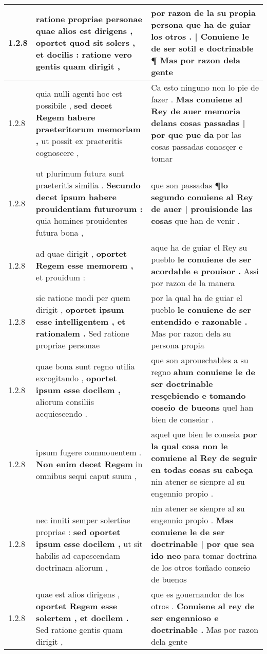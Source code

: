 \begin{tabular}{|p{1cm}|p{6.5cm}|p{6.5cm}|}
1.2.8 & ratione propriae personae \textbf{ quae alios est dirigens , oportet quod sit solers , et docilis : } ratione vero gentis quam dirigit , & por razon de la su propia persona \textbf{ que ha de guiar los otros . | Conuiene le de ser sotil e doctrinable ¶ } Mas por razon dela gente \\\hline
1.2.8 & quia nulli agenti hoc est possibile , \textbf{ sed decet Regem habere praeteritorum memoriam , } ut possit ex praeteritis cognoscere , & Ca esto ninguno non lo pie de fazer . \textbf{ Mas conuiene al Rey de auer memoria delans cosas passadas | por que pue da } por las cosas passadas conosçer e tomar \\\hline
1.2.8 & ut plurimum futura sunt praeteritis similia . \textbf{ Secundo decet ipsum habere prouidentiam futurorum : } quia homines prouidentes futura bona , & que son passadas \textbf{ ¶lo segundo conuiene al Rey de auer | prouisionde las cosas } que han de venir . \\\hline
1.2.8 & ad quae dirigit , \textbf{ oportet Regem esse memorem , } et prouidum : & aque ha de guiar el Rey su pueblo \textbf{ le conuiene de ser acordable e prouisor . } Assi por razon de la manera \\\hline
1.2.8 & sic ratione modi per quem dirigit , \textbf{ oportet ipsum esse intelligentem , et rationalem . } Sed ratione propriae personae & por la qual ha de guiar el pueblo \textbf{ le conuiene de ser entendido e razonable . } Mas por razon dela su persona propia \\\hline
1.2.8 & quae bona sunt regno utilia excogitando , \textbf{ oportet ipsum esse docilem , } aliorum consiliis acquiescendo . & que son aprouechables a su regno \textbf{ ahun conuiene le de ser doctrinable resçebiendo e tomando coseio de bueons } quel han bien de conseiar . \\\hline
1.2.8 & ipsum fugere commouentem . \textbf{ Non enim decet Regem } in omnibus sequi caput suum , & aquel que bien le conseia \textbf{ por la qual cosa non le conuiene al Rey de seguir en todas cosas su cabeça } nin atener se sienpre al su engennio propio . \\\hline
1.2.8 & nec inniti semper solertiae propriae : \textbf{ sed oportet ipsum esse docilem , } ut sit habilis ad capescendam doctrinam aliorum , & nin atener se sienpre al su engennio propio . \textbf{ Mas conuiene le de ser doctrinable | por que sea ido neo } para tomar doctrina de los otros tom̃ado conseio de buenos \\\hline
1.2.8 & quae est alios dirigens , \textbf{ oportet Regem esse solertem , et docilem . } Sed ratione gentis quam dirigit , & que es gouernandor de los otros . \textbf{ Conuiene al rey de ser engennioso e doctrinable . } Mas por razon dela gente \\\hline

\end{tabular}
